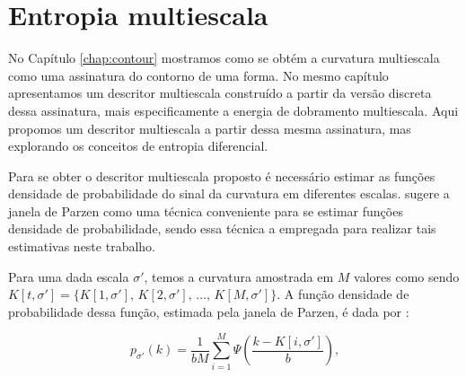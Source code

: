 \begin{comment}
\begin{equation}
D_f = 2 - \lim_{r \to 0}  \frac{\log{A(r)}}{\log{r}}.
\label{eq:df}
\end{equation}
Then, the derivative of th log-log curve for $N$ discrete values of radii $r_i>0$ gives 

\begin{equation}
MFD = \big(D_f(t_1)\text{, }D_f(t_2)\text{, }\ldots\text{ , }D_f(t_N)\big), 
\label{eq:dfm}
\end{equation}

\noindent where  $D_f(t) = 2 - \frac{du(t)}{dt}$, $t = \log{r}$ and $u(t) = \log{A(t)}$.

\end{comment}

\section{Entropia multiescala}

No Capítulo \ref{chap:contour} mostramos como se obtém a curvatura multiescala como uma assinatura do contorno de uma forma. No mesmo capítulo apresentamos um descritor multiescala construído a partir da versão discreta dessa assinatura, mais especificamente a energia de dobramento multiescala. Aqui propomos um descritor multiescala a partir dessa mesma assinatura, mas explorando os conceitos de entropia diferencial.

Para se obter o descritor multiescala proposto é necessário estimar as funções densidade de probabilidade do sinal da curvatura em diferentes escalas.  sugere a janela de Parzen \cite{Webb:2002} como uma técnica conveniente para se estimar funções densidade de probabilidade, sendo essa técnica a empregada para realizar tais estimativas neste trabalho.
 
 Para uma dada escala $\sigma'$, temos a curvatura amostrada em $M$ valores como sendo $K[t,\sigma'] = \{K[1,\sigma']\text{, }K[2,\sigma']\text{, }\ldots\text{, }K[M,\sigma']\}$. A função densidade de probabilidade dessa função, estimada pela janela de Parzen, é dada por \cite{Webb:2002}:  
 
\begin{equation}\label{eq:parzen}
p_{\sigma'}(k) = \frac{1}{bM}\sum\limits_{i=1}^M\Psi(\frac{k - K[i,\sigma']}{b})\text{,}
\end{equation}

